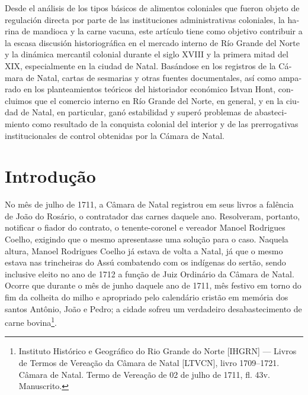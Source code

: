 \begin{refsection}
\begin{otherlanguage}{spanish}
    \begin{galoResumo}[Resumen]
        Desde el análisis de los tipos básicos de alimentos coloniales que fueron objeto de regulación directa por parte de las instituciones administrativas coloniales, la harina de mandioca y la carne vacuna, este artículo tiene como objetivo contribuir a la escasa discusión historiográfica en el mercado interno de Río Grande del Norte y la dinámica mercantil colonial durante el siglo XVIII y la primera mitad del XIX, especialmente en la ciudad de Natal. Basándose en los registros de la Cámara de Natal, cartas de sesmarias y otras fuentes documentales, así como amparado en los planteamientos teóricos del historiador económico Istvan Hont, concluimos que el comercio interno en Río Grande del Norte, en general, y en la ciudad de Natal, en particular, ganó estabilidad y superó problemas de abastecimiento como resultado de la conquista colonial del interior y de las prerrogativas institucionales de control obtenidas por la Cámara de Natal.
    \end{galoResumo}
    
\end{otherlanguage}

\section{Introdução}

No mês de julho de 1711, a Câmara de Natal registrou em seus livros a falência de João do Rosário, o contratador das carnes daquele ano. Resolveram, portanto, notificar o fiador do contrato, o tenente-coronel e vereador Manoel Rodrigues Coelho, exigindo que o mesmo apresentasse uma solução para o caso. Naquela altura, Manoel Rodrigues Coelho já estava de volta a Natal, já que o mesmo estava nas trincheiras do Assú combatendo com os indígenas do sertão, sendo inclusive eleito no ano de 1712 a função de Juiz Ordinário da Câmara de Natal. Ocorre que durante o mês de junho daquele ano de 1711, mês festivo em torno do fim da colheita do milho e apropriado pelo calendário cristão em memória dos santos Antônio, João e Pedro; a cidade sofreu um verdadeiro desabastecimento de carne bovina\footnote{Instituto Histórico e Geográfico do Rio Grande do Norte [IHGRN] --- Livros de Termos de Vereação da Câmara de Natal [LTVCN], livro 1709--1721. Câmara de Natal. Termo de Vereação de 02 de julho de 1711, fl. 43v. Manuscrito.}.


\end{refsection}
